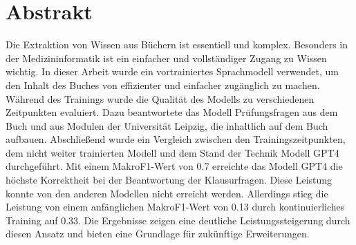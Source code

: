 \chapter*{Abstrakt}
Die Extraktion von Wissen aus Büchern ist essentiell und komplex.
Besonders in der Medizininformatik ist ein einfacher und vollständiger Zugang zu Wissen wichtig.
In dieser Arbeit wurde ein vortrainiertes Sprachmodell verwendet, um den Inhalt des Buches  von \citet{bb} effizienter und einfacher zugänglich zu machen.
Während des Trainings wurde die Qualität des Modells zu verschiedenen Zeitpunkten evaluiert.
Dazu beantwortete das Modell Prüfungsfragen aus dem Buch und aus Modulen der Universität Leipzig, die inhaltlich auf dem Buch aufbauen.
Abschließend wurde ein Vergleich zwischen den Trainingszeitpunkten, dem nicht weiter trainierten Modell und dem Stand der Technik Modell GPT4 durchgeführt.
Mit einem MakroF1-Wert von \num{0,7} erreichte das Modell GPT4 die höchste Korrektheit bei der Beantwortung der Klausurfragen.
Diese Leistung konnte von den anderen Modellen nicht erreicht werden.
Allerdings stieg die Leistung von einem anfänglichen MakroF1-Wert von \num{0.13} durch kontinuierliches Training auf \num{0.33}.
Die Ergebnisse zeigen eine deutliche Leistungssteigerung durch diesen Ansatz und bieten eine Grundlage für zukünftige Erweiterungen.
\vfill
